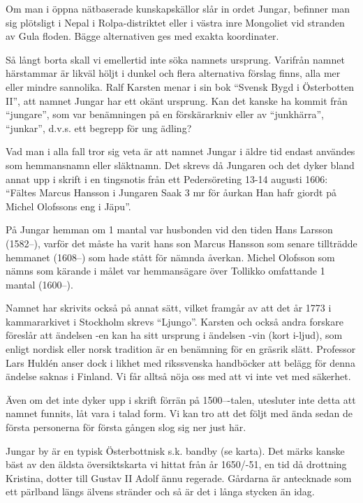 

Om man i öppna nätbaserade kunskapskällor slår in ordet Jungar, befinner man sig plötsligt i Nepal i Rolpa-distriktet eller  i västra inre Mongoliet vid stranden av Gula floden. Bägge alternativen ges med exakta koordinater.

Så långt borta skall vi emellertid inte söka namnets ursprung. Varifrån namnet härstammar är likväl höljt i dunkel och flera alternativa förslag finns, alla mer eller mindre sannolika. Ralf Karsten menar i sin bok ``Svensk Bygd i Österbotten II'', att namnet Jungar har ett okänt ursprung. Kan det kanske ha kommit från ``jungare'', som var benämningen på en förskärarkniv eller av ``junkhärra'', ``junkar'', d.v.s. ett begrepp för ung ädling?

Vad man i alla fall tror sig veta är att namnet Jungar i äldre tid endast användes som hemmansnamn eller släktnamn. Det skrevs då Jungaren och det dyker bland annat upp i skrift i en tingsnotis från ett Pedersöreting 13-14 augusti 1606: ``Fältes Marcus Hansson i Jungaren Saak 3 mr för åurkan Han hafr giordt på Michel Olofssons eng i Jäpu''.

På Jungar hemman om 1 mantal var husbonden vid den tiden Hans Larsson (1582--), varför det måste ha varit hans son Marcus Hansson som senare tillträdde hemmanet (1608--) som hade stått för nämnda åverkan. Michel Olofsson som nämns som kärande i målet var hemmansägare över Tollikko omfattande 1 mantal (1600--).

Namnet har skrivits också på annat sätt, vilket framgår av att det år 1773 i kammararkivet i Stockholm skrevs ``Ljungo''. Karsten och också andra forskare föreslår att ändelsen -en kan ha sitt ursprung i ändelsen -vin (kort i-ljud), som enligt nordisk eller norsk tradition är en benämning för en gräsrik slätt. Professor Lars Huldén anser dock i likhet med rikssvenska handböcker att belägg för denna ändelse saknas i Finland. Vi får alltså nöja oss med att vi inte vet med säkerhet.

Även om det inte dyker upp i skrift förrän på 1500---talen, utesluter inte detta att namnet funnits, låt vara i talad form. Vi kan tro att det följt med ända sedan de första personerna för första gången slog sig ner just här.


Jungar by är en typisk Österbottnisk s.k. bandby (se karta). Det märks kanske bäst av den äldsta översiktskarta vi hittat från år 1650/-51, en tid då drottning Kristina, dotter till Gustav II Adolf ännu regerade. Gårdarna är antecknade som ett pärlband längs älvens stränder och så är det i långa stycken än idag.

